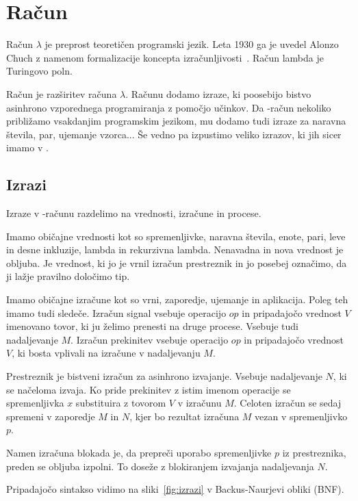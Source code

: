 \section{Račun \lae{}}\label{sec:lae}

Račun $\lambda$ je preprost teoretičen programski jezik. Leta 1930 ga je uvedel Alonzo Chuch z namenom formalizacije koncepta izračunljivosti~\cite{rojas2015tutorial}. Račun lambda je Turingovo poln.


Račun \lae{} je razširitev računa $\lambda$. Računu \lae{} dodamo izraze, ki poosebijo bistvo asinhrono vzporednega programiranja z pomočjo učinkov. Da \lae{}-račun nekoliko približamo vsakdanjim programskim jezikom, mu dodamo tudi izraze za  naravna števila, par, ujemanje vzorca... Še vedno pa izpustimo veliko izrazov, ki jih sicer imamo v \aeff{}.


\subsection{Izrazi}

Izraze v \lae{}-računu razdelimo na vrednosti, izračune in procese. 


Imamo običajne vrednosti kot so spremenljivke, naravna števila, enote, pari, leve in desne inkluzije, lambda in rekurzivna lambda.
Nenavadna in nova vrednost je obljuba. Je vrednost, ki jo je vrnil izračun prestreznik in jo posebej označimo, da ji lažje pravilno določimo tip.

Imamo običajne izračune kot so vrni, zaporedje, ujemanje in aplikacija.
Poleg teh imamo tudi sledeče.
Izračun signal vsebuje operacijo $op$ in pripadajočo vrednost $V$ imenovano tovor, ki ju želimo prenesti na druge procese. Vsebuje tudi nadaljevanje $M$.
Izračun prekinitev vsebuje operacijo $op$ in pripadajočo vrednost $V$, ki bosta vplivali na izračune v nadaljevanju $M$. 

Prestreznik je bistveni izračun za asinhrono izvajanje. Vsebuje nadaljevanje $N$, ki se načeloma izvaja.
Ko pride prekinitev z istim imenom operacije se spremenljivka $x$ substituira z tovorom $V$ v izračunu $M$. Celoten izračun se sedaj spremeni v zaporedje $M$ in $N$, kjer bo rezultat izračuna $M$ vezan v spremenljivko $p$.
 
Namen izračuna blokada je, da prepreči uporabo spremenljivke $p$ iz prestreznika, preden se obljuba izpolni. To doseže z blokiranjem izvajanja nadaljevanja $N$.


Pripadajočo sintakso vidimo na sliki~\ref{fig:izrazi} v Backus-Naurjevi obliki (BNF).

